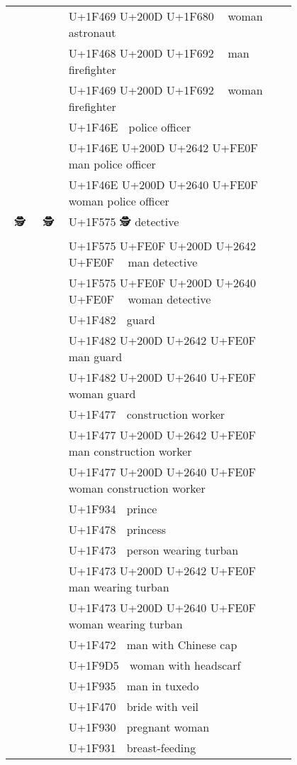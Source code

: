 \documentclass[a4paper,12pt]{ltjarticle}
\newcommand{\fontA}[1]{{\fontspec[RawFeature={mode=harf,+dist,+ccmp}]{Segoe UI Emoji} #1}}
\newcommand{\fontB}[1]{{\fontspec[RawFeature={mode=harf,+dist,+ccmp}]{Noto Color Emoji} #1}}
\begin{document}
\begin{longtable}[c]{ccp{0.8\linewidth}}
\fontA{👩‍🚀}&\fontB{👩‍🚀}&U+1F469 U+200D U+1F680 👩‍🚀 woman astronaut\\
\fontA{👨‍🚒}&\fontB{👨‍🚒}&U+1F468 U+200D U+1F692 👨‍🚒 man firefighter\\
\fontA{👩‍🚒}&\fontB{👩‍🚒}&U+1F469 U+200D U+1F692 👩‍🚒 woman firefighter\\
\fontA{👮}&\fontB{👮}&U+1F46E 👮 police officer\\
\fontA{👮‍♂️}&\fontB{👮‍♂️}&U+1F46E U+200D U+2642 U+FE0F 👮‍♂️ man police officer\\
\fontA{👮‍♀️}&\fontB{👮‍♀️}&U+1F46E U+200D U+2640 U+FE0F 👮‍♀️ woman police officer\\
\fontA{🕵}&\fontB{🕵}&U+1F575 🕵 detective\\
\fontA{🕵️‍♂️}&\fontB{🕵️‍♂️}&U+1F575 U+FE0F U+200D U+2642 U+FE0F 🕵️‍♂️ man detective\\
\fontA{🕵️‍♀️}&\fontB{🕵️‍♀️}&U+1F575 U+FE0F U+200D U+2640 U+FE0F 🕵️‍♀️ woman detective\\
\fontA{💂}&\fontB{💂}&U+1F482 💂 guard\\
\fontA{💂‍♂️}&\fontB{💂‍♂️}&U+1F482 U+200D U+2642 U+FE0F 💂‍♂️ man guard\\
\fontA{💂‍♀️}&\fontB{💂‍♀️}&U+1F482 U+200D U+2640 U+FE0F 💂‍♀️ woman guard\\
\fontA{👷}&\fontB{👷}&U+1F477 👷 construction worker\\
\fontA{👷‍♂️}&\fontB{👷‍♂️}&U+1F477 U+200D U+2642 U+FE0F 👷‍♂️ man construction worker\\
\fontA{👷‍♀️}&\fontB{👷‍♀️}&U+1F477 U+200D U+2640 U+FE0F 👷‍♀️ woman construction worker\\
\fontA{🤴}&\fontB{🤴}&U+1F934 🤴 prince\\
\fontA{👸}&\fontB{👸}&U+1F478 👸 princess\\
\fontA{👳}&\fontB{👳}&U+1F473 👳 person wearing turban\\
\fontA{👳‍♂️}&\fontB{👳‍♂️}&U+1F473 U+200D U+2642 U+FE0F 👳‍♂️ man wearing turban\\
\fontA{👳‍♀️}&\fontB{👳‍♀️}&U+1F473 U+200D U+2640 U+FE0F 👳‍♀️ woman wearing turban\\
\fontA{👲}&\fontB{👲}&U+1F472 👲 man with Chinese cap\\
\fontA{🧕}&\fontB{🧕}&U+1F9D5 🧕 woman with headscarf\\
\fontA{🤵}&\fontB{🤵}&U+1F935 🤵 man in tuxedo\\
\fontA{👰}&\fontB{👰}&U+1F470 👰 bride with veil\\
\fontA{🤰}&\fontB{🤰}&U+1F930 🤰 pregnant woman\\
\fontA{🤱}&\fontB{🤱}&U+1F931 🤱 breast-feeding\\

\end{longtable}
\end{document}
